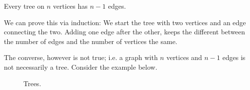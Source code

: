 \begin{theorem}
  Every tree on $n$ vertices has $n-1$ edges.
\end{theorem}

We can prove this via induction: We start the tree with two vertices and an edge connecting the two. Adding one edge after the other, keeps the different between the number of edges and the number of vertices the same.

The converse, however is not true; i.e. a graph with $n$ vertices and $n-1$ edges is not necessarily a tree. Consider the example below.

\begin{figure}[H]
\centering
{}
\caption{Trees.}
\end{figure}


